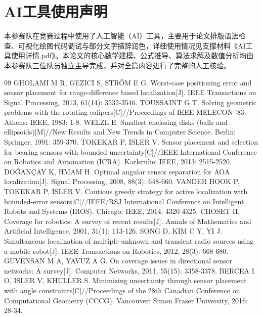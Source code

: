 \documentclass[zihao=-4,a4paper,UTF8]{ctexart}
\begin{document}
\section*{AI工具使用声明}
本参赛队在竞赛过程中使用了人工智能（AI）工具，主要用于论文排版语法检查、可视化绘图代码调试与部分文字措辞润色，详细使用情况见支撑材料《AI工具使用详情.pdf》。本论文的核心数学建模、公式推导、算法求解及数值分析均由本参赛队三位队员独立主导完成，并对全篇内容进行了完整的人工核验。

\begin{thebibliography}{99}
\setlength{\itemsep}{-1.5pt}
\setlength{\parskip}{0pt}
 GHOLAMI M R, GEZICI S, STR\"OM E G. Worst-case positioning error and sensor placement for range-difference based localization[J]. IEEE Transactions on Signal Processing, 2013, 61(14): 3532-3546.
 TOUSSAINT G T. Solving geometric problems with the rotating calipers[C]//Proceedings of IEEE MELECON '83. Athens: IEEE, 1983: 1-8.
 WELZL E. Smallest enclosing disks (balls and ellipsoids)[M]//New Results and New Trends in Computer Science. Berlin: Springer, 1991: 359-370.
 TOKEKAR P, ISLER V. Sensor placement and selection for bearing sensors with bounded uncertainty[C]//IEEE International Conference on Robotics and Automation (ICRA). Karlsruhe: IEEE, 2013: 2515-2520.
 DO\u{G}AN\c{C}AY K, HMAM H. Optimal angular sensor separation for AOA localization[J]. Signal Processing, 2008, 88(3): 648-660.
 VANDER HOOK P, TOKEKAR P, ISLER V. Cautious greedy strategy for active localization with bounded-error sensors[C]//IEEE/RSJ International Conference on Intelligent Robots and Systems (IROS). Chicago: IEEE, 2014: 4320-4325.
 CHOSET H. Coverage for robotics: A survey of recent results[J]. Annals of Mathematics and Artificial Intelligence, 2001, 31(1): 113-126.
 SONG D, KIM C Y, YI J. Simultaneous localization of multiple unknown and transient radio sources using a mobile robot[J]. IEEE Transactions on Robotics, 2012, 28(3): 668-680.
 GUVENSAN M A, YAVUZ A G. On coverage issues in directional sensor networks: A survey[J]. Computer Networks, 2011, 55(15): 3358-3378.
 BERCEA I O, ISLER V, KHULLER S. Minimizing uncertainty through sensor placement with angle constraints[C]//Proceedings of the 28th Canadian Conference on Computational Geometry (CCCG). Vancouver: Simon Fraser University, 2016: 28-34.
\end{thebibliography}



\end{document}
